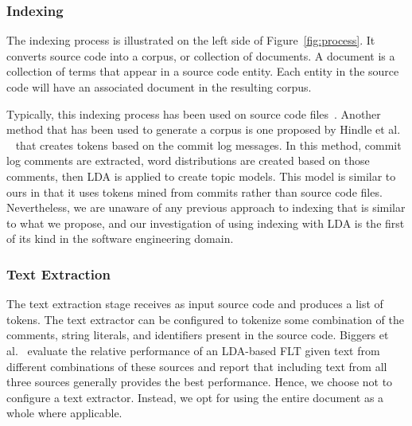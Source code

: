     \subsubsection{Indexing}
    The indexing process is illustrated on the left side of Figure~\ref{fig:process}.
    It converts source code into a corpus, or collection of documents.
    A document is a collection of terms that appear in a source code entity.
    Each entity in the source code will have an associated document in the resulting corpus.

    Typically, this indexing process has been used on source code files~\cite{Linstead-etal:2007b}\cite{Lukins-etal:2008}.
    Another method that has been used to generate a corpus is one proposed by Hindle et al. ~\cite{Hindle-etal:2009} that creates tokens based on the commit log messages.
    In this method,
    commit log comments are extracted,
    word distributions are created based on those comments,
    then LDA is applied to create topic models.
    This model is similar to ours in that it uses tokens mined from commits rather than source code files.
    Nevertheless, we are unaware of any previous approach to indexing that is similar to what we propose,
    and our investigation of using indexing with LDA is the first of its kind in the software engineering domain.

    \subsubsection{Text Extraction}
    The text extraction stage receives as input source code and produces a list of tokens.
    The text extractor can be configured to tokenize some combination of
    the comments, string literals, and identifiers present in the source code.
    Biggers et al.~\cite{Biggers-etal:2014} evaluate the relative performance of an LDA-based FLT
    given text from different combinations of these sources
    and report that including text from all three sources generally provides the best performance.
    Hence, we choose not to configure a text extractor.
    Instead, we opt for using the entire document as a whole where applicable.

